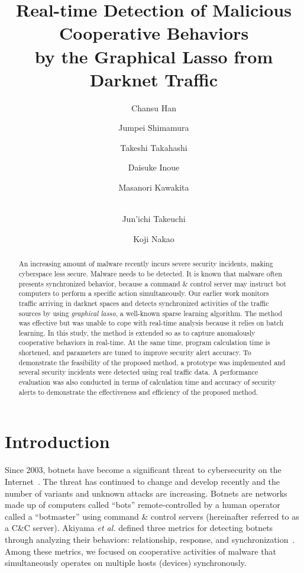 \documentclass[letterpaper]{sig-alternate-10pt}
\begin{document}
\title{Real-time Detection of Malicious Cooperative Behaviors\\by the Graphical Lasso from Darknet Traffic}

\author[1, 2]{\large Chansu Han}
\author[3]{\large Jumpei Shimamura}
\author[2]{\large Takeshi Takahashi}
\author[2]{\large Daisuke Inoue}
\author[1]{\large Masanori Kawakita}
\author[1, 2]{\large \\Jun'ichi Takeuchi}
\author[2]{\large Koji Nakao}



\maketitle

\begin{abstract}
An increasing amount of malware recently incurs severe security incidents, making cyberspace less secure.
Malware needs to be detected.
It is known that malware often presents synchronized behavior, because a command \& control server may instruct bot computers to perform a specific action simultaneously.
Our earlier work monitors traffic arriving in darknet spaces and detects synchronized activities of the traffic sources by using {\it graphical lasso}, a well-known sparse learning algorithm.
The method was effective but was unable to cope with real-time analysis because it relies on batch learning.
In this study, the method is extended so as to capture anomalously cooperative behaviors in real-time.
At the same time, program calculation time is shortened, and parameters are tuned to improve security alert accuracy.
To demonstrate the feasibility of the proposed method, a prototype was implemented and several security incidents were detected using real traffic data.
A performance evaluation was also conducted in terms of calculation time and accuracy of security alerts to demonstrate the effectiveness and efficiency of the proposed method.
\end{abstract}



\section{Introduction}
Since 2003, botnets have become a significant threat to cybersecurity on the Internet~\cite{McCarty}.
The threat has continued to change and develop recently and the number of variants and unknown attacks are increasing.
Botnets are networks made up of computers called ``bots'' remote-controlled by a human operator called a ``botmaster'' using command \& control servers (hereinafter referred to as a C\&C server).
Akiyama {\it et al.} defined three metrics for detecting botnets through analyzing their behaviors: relationship, response, and synchronization~\cite{Akiyama}.
Among these metrics, we focused on cooperative activities of malware that simultaneously operates on multiple hosts (devices) synchronously.
\end{document}
